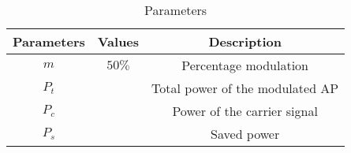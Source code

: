 \begin{table}[htbp]
    \centering
    \begin{tabular}{|c|c|c|} \hline
      \textbf{Parameters} & \textbf{Values} & \textbf{Description} \\ \hline
      $m$ & $50\%$ & Percentage modulation \\ \hline
      $P_t$ & & Total power of the modulated AP \\ \hline
      $P_c$ & & Power of the carrier signal \\ \hline
      $P_s$ & & Saved power \\ \hline
    \end{tabular}
    \vspace{3pt}
    \caption{Parameters}
    \label{tab:gate-21-ec-22}
\end{table}
